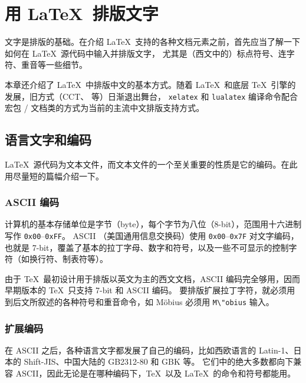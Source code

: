 \chapter{用 \LaTeX\ 排版文字}\label{chap:text}

\begin{intro}
文字是排版的基础。在介绍 \LaTeX\ 支持的各种文档元素之前，首先应当了解一下如何在 \LaTeX\ 源代码中输入并排版文字，
尤其是（西文中的）标点符号、连字符、重音等一些细节。

本章还介绍了 \LaTeX\ 中排版中文的基本方式。随着 \LaTeX\ 和底层 \TeX\ 引擎的发展，旧方式（CCT、 等）日渐退出舞台，
\texttt{xelatex} 和 \texttt{lualatex} 编译命令配合  宏包 / 文档类的方式为当前的主流中文排版支持方式。
\end{intro}

\section{语言文字和编码}\label{sec:encoding}

\LaTeX\ 源代码为文本文件，而文本文件的一个至关重要的性质是它的编码。在此用尽量短的篇幅介绍一下。

\subsection{ASCII 编码}\label{subsec:ascii}

计算机的基本存储单位是字节（byte），每个字节为八位（8-bit），范围用十六进制写作 \texttt{0x00}--\texttt{0xFF}。
ASCII （美国通用信息交换码）使用 \texttt{0x00}--\texttt{0x7F} 对文字编码，也就是 7-bit，覆盖了基本的拉丁字母、数字和符号，以及一些不可显示的控制字符（如换行符、制表符等）。

由于 \TeX\ 最初设计用于排版以英文为主的西文文档，ASCII 编码完全够用，因而早期版本的 \TeX\ 只支持 7-bit 和 ASCII 编码。
要排版扩展拉丁字符，就必须用到后文所叙述的各种符号和重音命令，如 M\"obius 必须用 \verb|M\"obius| 输入。

\subsection{扩展编码}\label{subsec:ext-encoding}

在 ASCII 之后，各种语言文字都发展了自己的编码，比如西欧语言的 Latin-1、日本的 Shift-JIS、中国大陆的 GB2312-80 和 GBK 等。
它们中的绝大多数都向下兼容 ASCII，因此无论是在哪种编码下，\TeX\ 以及 \LaTeX\ 的命令和符号都能用。

